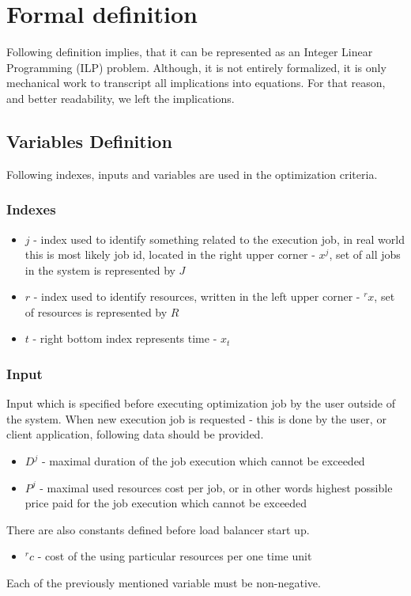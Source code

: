 
\section{Formal definition}\label{sec:formal-definition}
Following definition implies, that it can be represented as an Integer Linear Programming (ILP) problem.
Although, it is not entirely formalized, 
it is only mechanical work to transcript all implications into equations.
For that reason, and better readability, we left the implications.

\subsection{Variables Definition}\label{subsec:variables-definition}
Following indexes, inputs and variables are used in the optimization criteria.

\subsubsection{Indexes}
\begin{itemize}
	\item $j$ - index used to identify something related to the execution job,
	      in real world this is most likely job id, located in the right upper corner - $x^{j}$, 
	      set of all jobs in the system is represented by $J$
	\item $r$ - index used to identify resources, written in the left upper corner - ${}^{r}x$, set of resources is represented by $R$
	\item $t$ - right bottom index represents time - $x_t$
\end{itemize}

\subsubsection{Input}\label{subsubsec:formal-input}
Input which is specified before executing optimization job by the user outside of the system.
When new execution job is requested - this is done by the user, or client application,
following data should be provided.
\begin{itemize}
	\item $D^{j}$ - maximal duration of the job execution which cannot be exceeded
	\item $P^{j}$ - maximal used resources cost per job, or in other words highest possible price paid for the job execution which cannot be exceeded
\end{itemize} 
There are also constants defined before load balancer start up.
\begin{itemize}
	\item ${}^{r}c$ - cost of the using particular resources per one time unit
\end{itemize}
Each of the previously mentioned variable must be non-negative.

